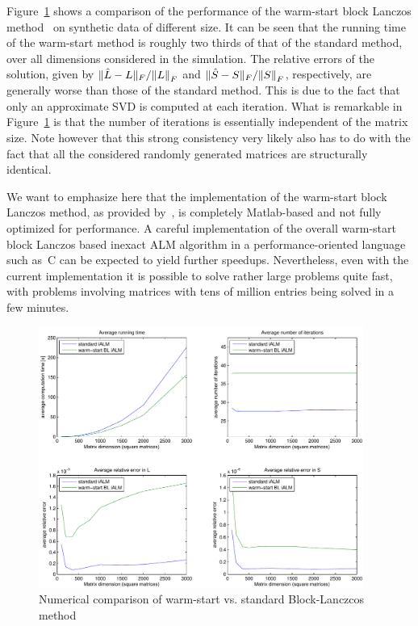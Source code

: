 \documentclass{../../common/projectreport}
\begin{document}
Figure~\ref{Algorithms:Discussion:SVD:BLWScomptarison:figure} shows a comparison of the performance of the warm-start block Lanczos method~\cite{Lin:2010uq} on synthetic data of different size. It can be seen that the running time of the warm-start method is roughly two thirds of that of the standard method, over all dimensions considered in the simulation. The relative errors of the solution, given by $\|\hat{L}-L\|_F/{\left\|L\right\|}_{F}^{}$ and $\|\hat{S}-S\|_F/{\left\|S\right\|}_{F}^{}$, respectively, are generally worse than those of the standard method. This is due to the fact that only an approximate SVD is computed at each iteration. What is remarkable in Figure~\ref{Algorithms:Discussion:SVD:BLWScomptarison:figure} is that the number of iterations is essentially independent of the matrix size. Note however that this strong consistency very likely also has to do with the fact that all the considered randomly generated matrices are structurally identical. 

We want to emphasize here that the implementation of the warm-start block Lanczos method, as provided by~\cite{Lin:2011kx}, is completely Matlab-based and not fully optimized for performance. A careful implementation of the overall warm-start block Lanczos based inexact ALM algorithm in a performance-oriented language such as~C can be expected to yield further speedups. Nevertheless, even with the current implementation it is possible to solve rather large problems quite fast, with problems involving matrices with tens of million entries being solved in a few minutes. 

\begin{figure}[htbp]
\centering
\includegraphics[width=0.95\textwidth]{../figures/BLWS_comparison}
\caption{Numerical comparison of warm-start vs. standard Block-Lanczcos method}
\label{Algorithms:Discussion:SVD:BLWScomptarison:figure}
\end{figure}
\end{document}
